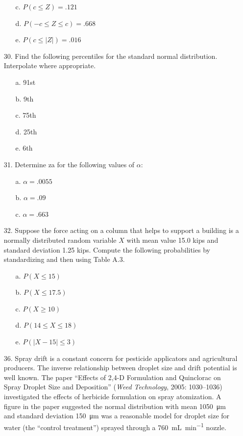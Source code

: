 \documentclass[letterpaper,12pt]{article}
\begin{document}
\begin{enumerate}
\begin{enumerate}
      \item[c.]
        $P(c \le Z) = .121$
      \item[d.]
        $P(-c \le Z \le c) = .668$
      \item[e.]
        $P(c \le |Z|) = .016$
    \end{enumerate}
  \item[30.]
    Find the following percentiles for the standard normal distribution. Interpolate where appropriate.
    \begin{enumerate}
      \item[a.]
        91st
      \item[b.]
        9th
      \item[c.]
        75th
      \item[d.]
        25th
      \item[e.]
        6th
    \end{enumerate}
  \item[31.]
    Determine za for the following values of $\alpha$:
    \begin{enumerate}
      \item[a.]
        $\alpha = .0055$
      \item[b.]
        $\alpha = .09$
      \item[c.]
        $\alpha = .663$
    \end{enumerate}
  \item[32.]
    Suppose the force acting on a column that helps to support a building is a normally distributed random variable $X$ with mean value 15.0 kips and standard deviation 1.25 kips. Compute the following probabilities by standardizing and then using Table A.3.
    \begin{enumerate}
      \item[a.]
        $P(X \le 15)$
      \item[b.]
        $P(X \le 17.5)$
      \item[c.]
        $P(X \ge 10)$
      \item[d.]
        $P(14 \le X \le 18)$
      \item[e.]
        $P(|X - 15| \le 3)$
    \end{enumerate}
  \item[36.]
    Spray drift is a constant concern for pesticide applicators and agricultural producers. The inverse relationship between droplet size and drift potential is well known. The paper ``Effects of 2,4-D Formulation and Quinclorac on Spray Droplet Size and Deposition'' (\textit{Weed Technology}, 2005: 1030–1036) investigated the effects of herbicide formulation on spray atomization. A figure in the paper suggested the normal distribution with mean \qty{1050}{\micro\meter} and standard deviation \qty{150}{\micro\meter} was a reasonable model for droplet size for water (the ``control treatment'') sprayed through a \qty{760}{\milli\liter\per\minute} nozzle.

\end{enumerate}
\end{document}

